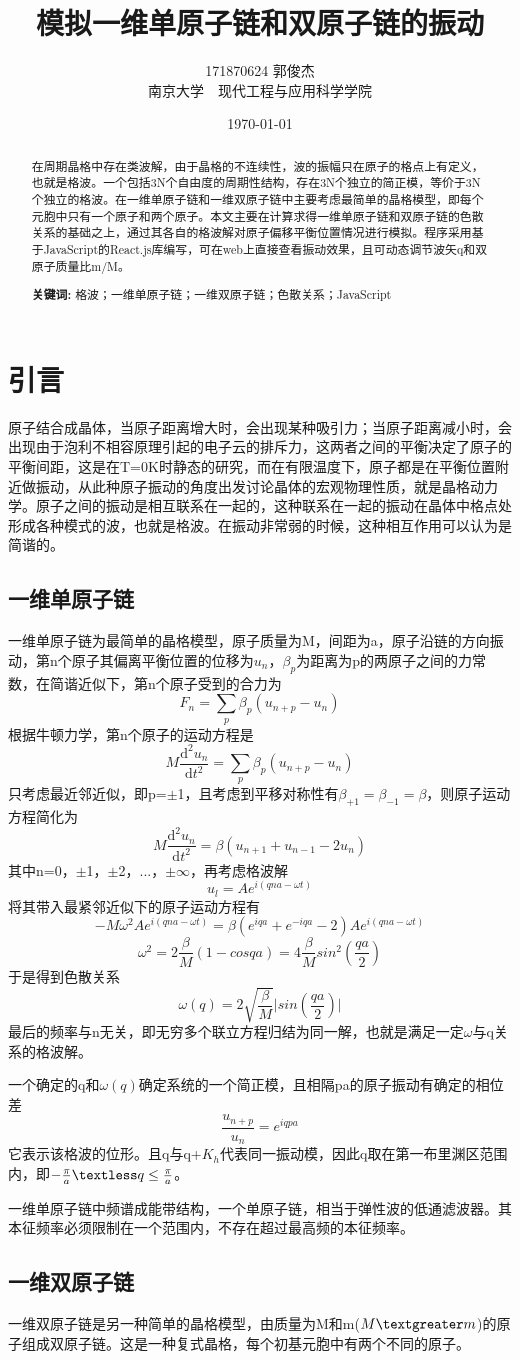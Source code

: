 \documentclass[UTF8]{article}
\title{模拟一维单原子链和双原子链的振动}   %
\author{171870624 郭俊杰\\南京大学$\quad$现代工程与应用科学学院}   %
\date{\today}    %
\begin{document}
\maketitle

\begin{abstract}
在周期晶格中存在类波解，由于晶格的不连续性，波的振幅只在原子的格点上有定义，也就是格波。一个包括3N个自由度的周期性结构，存在3N个独立的简正模，等价于3N个独立的格波。在一维单原子链和一维双原子链中主要考虑最简单的晶格模型，即每个元胞中只有一个原子和两个原子。本文主要在计算求得一维单原子链和双原子链的色散关系的基础之上，通过其各自的格波解对原子偏移平衡位置情况进行模拟。程序采用基于JavaScript的React.js库编写，可在web上直接查看振动效果，且可动态调节波矢q和双原子质量比m/M。 \\
\par\textbf{关键词: } 格波；一维单原子链；一维双原子链；色散关系；JavaScript
\end{abstract}


\section{引言}
原子结合成晶体，当原子距离增大时，会出现某种吸引力；当原子距离减小时，会出现由于泡利不相容原理引起的电子云的排斥力，这两者之间的平衡决定了原子的平衡间距，这是在T=0K时静态的研究，而在有限温度下，原子都是在平衡位置附近做振动，从此种原子振动的角度出发讨论晶体的宏观物理性质，就是晶格动力学。原子之间的振动是相互联系在一起的，这种联系在一起的振动在晶体中格点处形成各种模式的波，也就是格波。在振动非常弱的时候，这种相互作用可以认为是简谐的。

\subsection{一维单原子链}
一维单原子链为最简单的晶格模型，原子质量为M，间距为a，原子沿链的方向振动，第n个原子其偏离平衡位置的位移为$u_n$，$\beta_p$为距离为p的两原子之间的力常数，在简谐近似下，第n个原子受到的合力为$$F_n = \sum_p\beta_p(u_{n+p}-u_n)$$根据牛顿力学，第n个原子的运动方程是$$M\frac{\mathrm{d}^2u_n}{\mathrm{d}t^2}=\sum_p\beta_p(u_{n+p}-u_n)$$只考虑最近邻近似，即p=$\pm$1，且考虑到平移对称性有$\beta_{+1}=\beta_{-1}=\beta$，则原子运动方程简化为$$M\frac{\mathrm{d}^2u_n}{\mathrm{d}t^2}=\beta(u_{n+1}+u_{n-1}-2u_{n})$$其中n=0，$\pm$1，$\pm$2，...，$\pm\infty$，再考虑格波解$$u_l=Ae^{i(qna-\omega t)}$$将其带入最紧邻近似下的原子运动方程有$$-M\omega^2Ae^{i(qna-\omega t)}=\beta(e^{iqa}+e^{-iqa}-2)Ae^{i(qna-\omega t)}$$ $$\omega^2=2\frac{\beta}{M}(1-cosqa)=4\frac{\beta}{M}sin^2(\frac{qa}{2})$$于是得到色散关系$$\omega(q)=2\sqrt{\frac{\beta}{M}}\vert{sin(\frac{qa}{2})}\vert$$最后的频率与n无关，即无穷多个联立方程归结为同一解，也就是满足一定$\omega$与q关系的格波解。
\par
一个确定的q和$\omega(q)$确定系统的一个简正模，且相隔pa的原子振动有确定的相位差$$\frac{u_{n+p}}{u_n}=e^{iqpa}$$它表示该格波的位形。且q与q+$K_h$代表同一振动模，因此q取在第一布里渊区范围内，即$-\frac{\pi}{a} \textless q\leq\frac{\pi}{a}$。
\par
一维单原子链中频谱成能带结构，一个单原子链，相当于弹性波的低通滤波器。其本征频率必须限制在一个范围内，不存在超过最高频的本征频率。

\subsection{一维双原子链}
一维双原子链是另一种简单的晶格模型，由质量为M和m($M\textgreater m$)的原子组成双原子链。这是一种复式晶格，每个初基元胞中有两个不同的原子。
\end{document}
